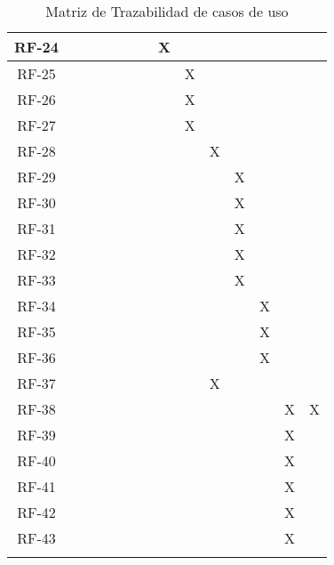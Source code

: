 \begin{center}
\begin{longtable}{ c || p{0.75cm} p{0.75cm} p{0.75cm} p{0.75cm} p{0.75cm} p{0.75cm} p{0.75cm} p{0.75cm} p{0.75cm} p{0.75cm} p{0.75cm} p{0.75cm} p{0.75cm}}
	RF-24 &  &  &  &  &  &  & X &  &  &  &  &  &  \\ \hline
	RF-25 &  &  &  &  &  &  &  & X &  &  &  &  &  \\ \hline
	RF-26 &  &  &  &  &  &  &  & X &  &  &  &  &  \\ \hline
	RF-27 &  &  &  &  &  &  &  & X &  &  &  &  &  \\ \hline
	RF-28 &  &  &  &  &  &  &  &  & X &  &  &  &  \\ \hline
	RF-29 &  &  &  &  &  &  &  &  &  & X &  &  &  \\ \hline
	RF-30 &  &  &  &  &  &  &  &  &  & X &  &  &  \\ \hline
	RF-31 &  &  &  &  &  &  &  &  &  & X &  &  &  \\ \hline
	RF-32 &  &  &  &  &  &  &  &  &  & X &  &  &  \\ \hline
	RF-33 &  &  &  &  &  &  &  &  &  & X &  &  &  \\ \hline
	RF-34 &  &  &  &  &  &  &  &  &  &  & X &  &  \\ \hline
	RF-35 &  &  &  &  &  &  &  &  &  &  & X &  &  \\ \hline
	RF-36 &  &  &  &  &  &  &  &  &  &  & X &  &  \\ \hline
	RF-37 &  &  &  &  &  &  &  &  & X &  &  &  &  \\ \hline
	RF-38 &  &  &  &  &  &  &  &  &  &  &  & X & X \\ \hline
	RF-39 &  &  &  &  &  &  &  &  &  &  &  & X &  \\ \hline
	RF-40 &  &  &  &  &  &  &  &  &  &  &  & X &  \\ \hline
	RF-41 &  &  &  &  &  &  &  &  &  &  &  & X &  \\ \hline
	RF-42 &  &  &  &  &  &  &  &  &  &  &  & X &  \\ \hline
	RF-43 &  &  &  &  &  &  &  &  &  &  &  & X &  \\ \hline
\caption{Matriz de Trazabilidad de casos de uso}
\label{tab:matriztraz}
\end{longtable}
\end{center}
